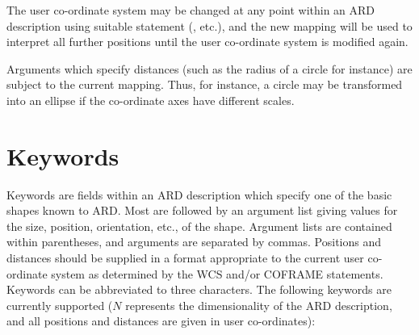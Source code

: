 The user co-ordinate system may be changed at any point within an ARD
description using suitable statement (, etc.),
and the new mapping will be used to interpret all further positions until
the user co-ordinate system is modified again.

Arguments which specify distances (such as the radius of a circle for instance)
are subject to the current mapping. Thus, for instance, a circle may be
transformed into an ellipse if the co-ordinate axes have different scales. 

\section{\label{SEC:KEYW}Keywords}
Keywords are fields within an ARD description which specify one of the
basic shapes known to ARD. Most are followed by an argument list giving
values for the size, position, orientation, etc., of the shape. Argument
lists are contained within parentheses, and arguments are separated by
commas. Positions and distances should be supplied in a format
appropriate to the current user co-ordinate system as determined by the
WCS and/or COFRAME statements. Keywords can be abbreviated to three
characters. The following keywords are currently supported ($N$
represents the dimensionality of the ARD description, and all positions
and distances are given in user co-ordinates):

